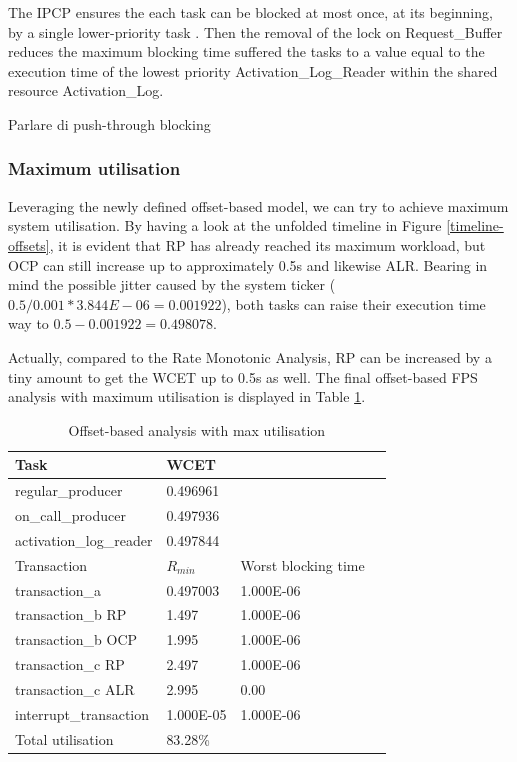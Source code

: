 \documentclass{article}
\begin{document}
The IPCP ensures the each task can be blocked at most once, at its beginning, by a single lower-priority task \cite{ada-pcp}. Then the removal of the lock on Request\_Buffer reduces the maximum blocking time suffered the tasks to a value equal to the execution time of the lowest priority Activation\_Log\_Reader within the shared resource Activation\_Log.

Parlare di push-through blocking

\subsubsection{Maximum utilisation} \label{maximum-utilisation}

Leveraging the newly defined offset-based model, we can try to achieve maximum system utilisation. By having a look at the unfolded timeline in Figure \ref{timeline-offsets}, it is evident that RP has already reached its maximum workload, but OCP can still increase up to approximately 0.5s and likewise ALR. Bearing in mind the possible jitter caused by the system ticker ($0.5 / 0.001 * 3.844E-06 = 0.001922$), both tasks can raise their execution time way to $0.5 - 0.001922 = 0.498078$.

Actually, compared to the Rate Monotonic Analysis, RP can be increased by a tiny amount to get the WCET up to 0.5s as well. The final offset-based FPS analysis with maximum utilisation is displayed in Table \ref{tab:off-approx-w-pr-max-utilisation}.

\begin{table}[!htbp]
   \centering
   \begin{tabular}{llll}
    \toprule
    Task & WCET \\
    \midrule
    regular\_producer & 0.496961 \\
    on\_call\_producer & 0.497936 \\
    activation\_log\_reader & 0.497844 \\
    \toprule
    \toprule
    Transaction & $R_{min}$ & Worst blocking time \\
    \midrule
    transaction\_a & 0.497003 &  1.000E-06 \\
    transaction\_b RP & 1.497 & 1.000E-06 \\
    transaction\_b OCP & 1.995 & 1.000E-06 \\
    transaction\_c RP & 2.497 & 1.000E-06 \\
    transaction\_c ALR & 2.995 & 0.00 \\
    interrupt\_transaction & 1.000E-05 & 1.000E-06 \\
    \toprule
    \toprule
    Total utilisation & 83.28\% \\
   \end{tabular}
   \caption{Offset-based analysis with max utilisation}
   \label{tab:off-approx-w-pr-max-utilisation}
 \end{table}
\end{document}

